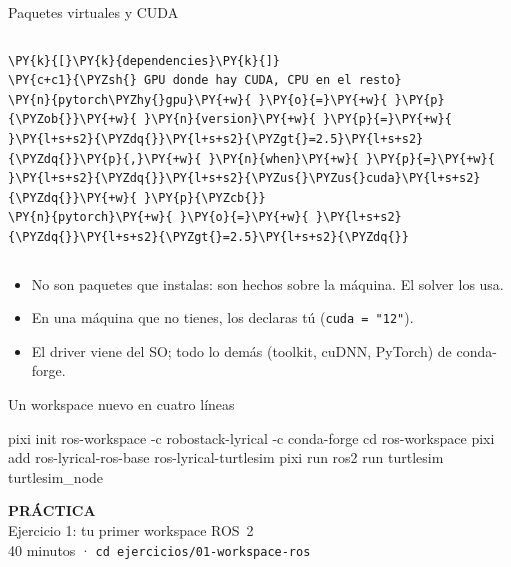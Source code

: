 \documentclass[aspectratio=169]{beamer}
\newcommand{\practicaframe}[2]{%
\begin{frame}
  \centering
  \vfill
  {\Large \textbf{PRÁCTICA}}\\[1em]
  {\large #1}\\[0.5em]
  {\color{halfgray} #2}
  \vfill
\end{frame}%
}
\begin{document}
\begin{frame}[fragile]{Paquetes virtuales y CUDA}
\begin{columns}[T]
\begin{filelisting}
\begin{Verbatim}[commandchars=\\\{\},breaklines,breakanywhere]
\PY{k}{[}\PY{k}{dependencies}\PY{k}{]}
\PY{c+c1}{\PYZsh{} GPU donde hay CUDA, CPU en el resto}
\PY{n}{pytorch\PYZhy{}gpu}\PY{+w}{ }\PY{o}{=}\PY{+w}{ }\PY{p}{\PYZob{}}\PY{+w}{ }\PY{n}{version}\PY{+w}{ }\PY{p}{=}\PY{+w}{ }\PY{l+s+s2}{\PYZdq{}}\PY{l+s+s2}{\PYZgt{}=2.5}\PY{l+s+s2}{\PYZdq{}}\PY{p}{,}\PY{+w}{ }\PY{n}{when}\PY{+w}{ }\PY{p}{=}\PY{+w}{ }\PY{l+s+s2}{\PYZdq{}}\PY{l+s+s2}{\PYZus{}\PYZus{}cuda}\PY{l+s+s2}{\PYZdq{}}\PY{+w}{ }\PY{p}{\PYZcb{}}
\PY{n}{pytorch}\PY{+w}{ }\PY{o}{=}\PY{+w}{ }\PY{l+s+s2}{\PYZdq{}}\PY{l+s+s2}{\PYZgt{}=2.5}\PY{l+s+s2}{\PYZdq{}}
\end{Verbatim}
\end{filelisting}
\end{columns}
\vfill
\begin{itemize}
    \item No son paquetes que instalas: son hechos sobre la máquina. El solver los usa.
    \item En una máquina que no tienes, los declaras tú (\lstinline|cuda = "12"|).
    \item El driver viene del SO; todo lo demás (toolkit, cuDNN, PyTorch) de conda-forge.
\end{itemize}
\end{frame}

\begin{frame}[fragile]{Un workspace nuevo en cuatro líneas}
\vfill
\begin{terminal}
pixi init ros-workspace -c robostack-lyrical -c conda-forge
cd ros-workspace
pixi add ros-lyrical-ros-base ros-lyrical-turtlesim
pixi run ros2 run turtlesim turtlesim_node
\end{terminal}
\vfill
\end{frame}

\practicaframe{Ejercicio 1: tu primer workspace ROS~2}{40 minutos · \texttt{cd ejercicios/01-workspace-ros}}
\end{document}

